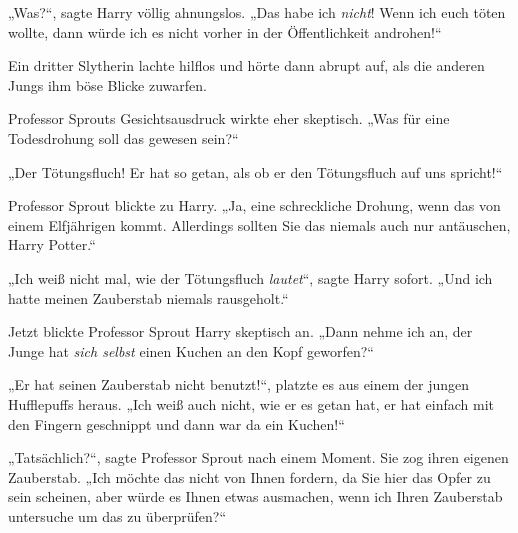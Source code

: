 „Was?“, sagte Harry völlig ahnungslos. „Das habe ich \emph{nicht}! Wenn ich euch töten wollte, dann würde ich es nicht vorher in der Öffentlichkeit androhen!“

Ein dritter Slytherin lachte hilflos und hörte dann abrupt auf, als die anderen Jungs ihm böse Blicke zuwarfen.

Professor Sprouts Gesichtsausdruck wirkte eher skeptisch. „Was für eine Todesdrohung soll das gewesen sein?“

„Der Tötungsfluch! Er hat so getan, als ob er den Tötungsfluch auf uns spricht!“

Professor Sprout blickte zu Harry. „Ja, eine schreckliche Drohung, wenn das von einem Elfjährigen kommt. Allerdings sollten Sie das niemals auch nur antäuschen, Harry Potter.“

„Ich weiß nicht mal, wie der Tötungsfluch \emph{lautet}“, sagte Harry sofort. „Und ich hatte meinen Zauberstab niemals rausgeholt.“

Jetzt blickte Professor Sprout Harry skeptisch an. „Dann nehme ich an, der Junge hat \emph{sich selbst} einen Kuchen an den Kopf geworfen?“

„Er hat seinen Zauberstab nicht benutzt!“, platzte es aus einem der jungen Hufflepuffs heraus. „Ich weiß auch nicht, wie er es getan hat, er hat einfach mit den Fingern geschnippt und dann war da ein Kuchen!“

„Tatsächlich?“, sagte Professor Sprout nach einem Moment. Sie zog ihren eigenen Zauberstab. „Ich möchte das nicht von Ihnen fordern, da Sie hier das Opfer zu sein scheinen, aber würde es Ihnen etwas ausmachen, wenn ich Ihren Zauberstab untersuche um das zu überprüfen?“

